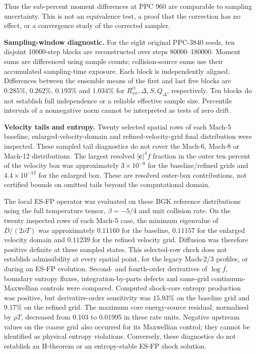 \documentclass[lineno,paper]{JFM-FLM_Au}
\newenvironment{revision}{\nolinenumbers\begin{tcolorbox}[breakable,colback=revisionyellow,colframe=revisionyellow,boxrule=0pt,arc=0pt,left=5pt,right=5pt,top=5pt,bottom=5pt,before skip=6pt,after skip=6pt]\captionsetup{width=\linewidth}}{\end{tcolorbox}\linenumbers}
\newenvironment{revision}{}{}
\newcommand{\cl}{\mathrm{cl}}
\begin{document}
\begin{revision}
Thus the sub-percent moment differences at PPC 960 are comparable to sampling uncertainty. This is not an equivalence test, a proof that the correction has no effect, or a convergence study of the corrected sampler.

\textbf{Sampling-window diagnostic.} For the eight original PPC-3840 seeds, ten disjoint 10000-step blocks are reconstructed over steps 80000--180000. Moment sums are differenced using sample counts; collision-source sums use their accumulated sampling-time exposure. Each block is independently aligned. Differences between the ensemble means of the first and last five blocks are $0.285\%$, $0.262\%$, $0.193\%$ and $1.034\%$ for $R^{\cl}_{xx},\Delta,S,Q_\Delta$, respectively. Ten blocks do not establish full independence or a reliable effective sample size. Percentile intervals of a nonnegative norm cannot be interpreted as tests of zero drift.

\textbf{Velocity tails and entropy.} Twenty selected spatial rows of each Mach-5 baseline, enlarged-velocity-domain and refined-velocity-grid final distribution were inspected. These sampled tail diagnostics do not cover the Mach-6, Mach-8 or Mach-12 distributions. The largest resolved $|\boldsymbol c|^4 f$ fraction in the outer ten percent of the velocity box was approximately $3\times10^{-8}$ for the baseline/refined grids and $4.4\times10^{-12}$ for the enlarged box. These are resolved outer-box contributions, not certified bounds on omitted tails beyond the computational domain.

The local ES-FP operator was evaluated on these BGK reference distributions using the full temperature tensor, $\beta=-5/4$ and unit collision rate. On the twenty inspected rows of each Mach-5 case, the minimum eigenvalue of $D/(2\nu T)$ was approximately $0.11160$ for the baseline, $0.11157$ for the enlarged velocity domain and $0.11239$ for the refined velocity grid. Diffusion was therefore positive definite at these sampled states. This selected-row check does not establish admissibility at every spatial point, for the legacy Mach-2/3 profiles, or during an ES-FP evolution. Second- and fourth-order derivatives of $\log f$, boundary entropy fluxes, integration-by-parts defects and same-grid continuum-Maxwellian controls were compared. Computed shock-core entropy production was positive, but derivative-order sensitivity was $15.93\%$ on the baseline grid and $9.17\%$ on the refined grid. The maximum core energy-source residual, normalised by $\rho T$, decreased from 0.103 to 0.01995 in these rate units. Negative upstream values on the coarse grid also occurred for its Maxwellian control; they cannot be identified as physical entropy violations. Conversely, these diagnostics do not establish an H-theorem or an entropy-stable ES-FP shock solution.


\end{revision}
\end{document}
